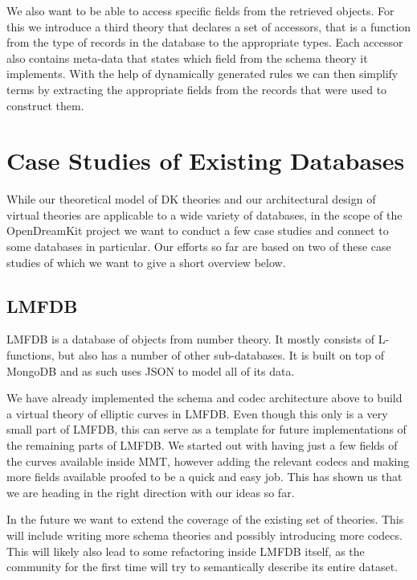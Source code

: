 \documentclass{deliverablereport}
\begin{document}
We also want to be able to access specific fields from the retrieved objects. For this we introduce a third theory that declares a set of accessors, that is a function from the type of records in the database to the appropriate types. Each accessor also contains meta-data that states which field from the schema theory it implements. With the help of dynamically generated rules we can then simplify terms by extracting the appropriate fields from the records that were used to construct them.

\section{Case Studies of Existing Databases}\label{sec:cases}

While our theoretical model of DK theories and our architectural design of virtual theories are applicable to a wide variety of databases, in the scope of the OpenDreamKit project we want to conduct a few case studies and connect to some databases in particular. Our efforts so far are based on two of these case studies of which we want to give a short overview below.

\subsection{LMFDB}\label{sec:lmfdb}

LMFDB \cite{lmfdb} is a database of objects from number theory. It mostly consists of L-functions, but also has a number of other sub-databases. It is built on top of MongoDB and as such uses JSON to model all of its data.

We have already implemented the schema and codec architecture above to build a virtual theory of elliptic curves in LMFDB. Even though this only is a very small part of LMFDB, this can serve as a template for future implementations of the remaining parts of LMFDB. We started out with having just a few fields of the curves available inside MMT, however adding the relevant codecs and making more fields available proofed to be a quick and easy job. This has shown us that we are heading in the right direction with our ideas so far.

In the future we want to extend the coverage of the existing set of theories. This will include writing more schema theories and possibly introducing more codecs. This will likely also lead to some refactoring inside LMFDB itself, as the community for the first time will try to semantically describe its entire dataset.
\end{document}
